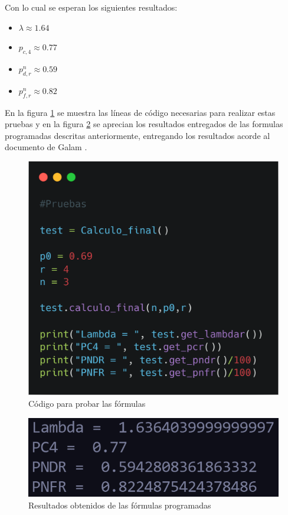 Con lo cual se esperan los siguientes resultados: 
\begin{itemize}
    \item $\lambda \approx 1.64$
    \item $p_{c,4} \approx 0.77$
    \item $p_{d,r}^n \approx 0.59$
    \item $p_{f,r}^n \approx 0.82$
\end{itemize}

En la figura \ref{graphic:testcode} se muestra las líneas de código necesarias para realizar estas pruebas y en la figura \ref{graphic:testresult} se aprecian los resultados entregados de las formulas programadas descritas anteriormente, entregando los resultados acorde al documento de Galam \cite{Galam2008}.
\begin{figure}[!htb]
    \centering
    \includegraphics[scale=.25]{TT/img/pruebas/test-formulas.png}
    \caption{Código para probar las fórmulas}
    \label{graphic:testcode}
\end{figure}

\begin{figure}[!htb]
    \centering
    \includegraphics[scale=1]{TT/img/pruebas/test_result.png}
    \caption{Resultados obtenidos de las fórmulas programadas}
    \label{graphic:testresult}
\end{figure}

